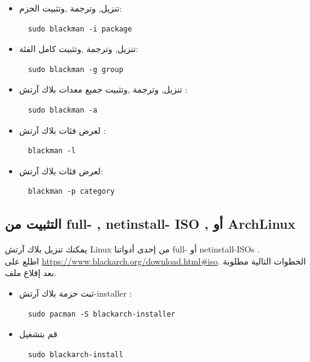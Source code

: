 \documentclass[a4paper, oneside, 11pt]{book}
\begin{document}
\begin{itemize}
\item تنزيل, وترجمة ,وتثبيت الحزم:
\begin{lstlisting}
  sudo blackman -i package
\end{lstlisting}

\item تنزيل, وترجمة ,وتثبيت كامل الفئة:
\begin{lstlisting}
  sudo blackman -g group
\end{lstlisting}

\item	تنزيل, وترجمة ,وتثبيت جميع معدات بلاك آرتش :
\begin{lstlisting}
  sudo blackman -a
\end{lstlisting}

\item	لعرض فئات بلاك آرتش :
\begin{lstlisting}
  blackman -l
\end{lstlisting}

\item	لعرض فئات بلاك آرتش: 
\begin{lstlisting}
  blackman -p category
\end{lstlisting}

\end{itemize}

\subsection{التثبيت من full- , netinstall- ISO , أو ArchLinux}
يمكنك تنزيل بلاك آرتش Linux من إحدى أدواتنا full- أو netinstall-ISOs .
\\اطلع  على 
\url{https://www.blackarch.org/download.html#iso}. الخطوات التالية مطلوبة بعد إقلاع ملف.

\begin{itemize}
\item	ثبت حزمة بلاك آرتش-installer :
\begin{lstlisting}
  sudo pacman -S blackarch-installer
\end{lstlisting}

\item	قم بتشغيل
\begin{lstlisting}
  sudo blackarch-install
\end{lstlisting}

\end{itemize}

\end{document}
